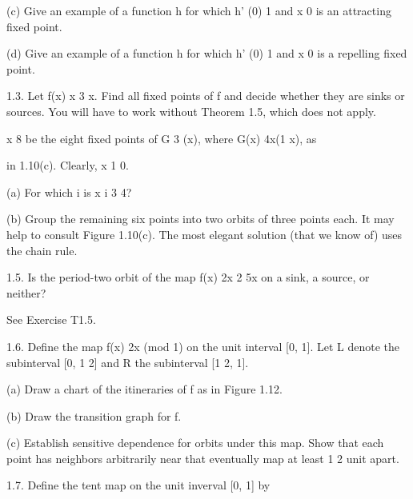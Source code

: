 \documentclass[12pt]{article}
\begin{document}
(c) Give an example of a function h for which h' (0)  1 and x  0 is an attracting fixed point.

(d) Give an example of a function h for which h' (0)  1 and x  0 is a repelling fixed point.

1.3. Let f(x)  x 3 x. Find all fixed points of f and decide whether they are sinks or sources. You will 
have to work without Theorem 1.5, which does not apply.

  x 8 be the eight fixed points of G 3 (x), where G(x)  4x(1  x), as

in 1.10(c). Clearly, x 1  0.

(a) For which i is x i  3  4?

(b) Group the remaining six points into two orbits of three points each. It may help to consult Figure 
1.10(c). The most elegant solution (that we know of) uses the chain rule.

1.5. Is the period-two orbit of the map f(x)  2x 2  5x on a sink, a source, or neither?

See Exercise T1.5.

1.6. Define the map f(x)  2x (mod 1) on the unit interval [0, 1]. Let L denote the subinterval [0, 1  2] 
and R the subinterval [1  2, 1].

(a) Draw a chart of the itineraries of f as in Figure 1.12.

(b) Draw the transition graph for f.

(c) Establish sensitive dependence for orbits under this map. Show that each point has neighbors 
arbitrarily near that eventually map at least 1  2 unit apart.

1.7. Define the tent map on the unit inverval [0, 1] by
\end{document}
